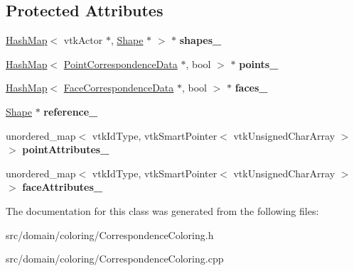 \subsection*{Protected Attributes}
\begin{DoxyCompactItemize}
\item 
\hypertarget{class_correspondence_coloring_a279562196a4636d10f1d54319eb96129}{}\hyperlink{class_hash_map}{Hash\+Map}$<$ vtk\+Actor $\ast$, \hyperlink{class_shape}{Shape} $\ast$ $>$ $\ast$ {\bfseries shapes\+\_\+}\label{class_correspondence_coloring_a279562196a4636d10f1d54319eb96129}

\item 
\hypertarget{class_correspondence_coloring_a925be65ac98dabc0959085f7972c79f1}{}\hyperlink{class_hash_map}{Hash\+Map}$<$ \hyperlink{class_point_correspondence_data}{Point\+Correspondence\+Data} $\ast$, bool $>$ $\ast$ {\bfseries points\+\_\+}\label{class_correspondence_coloring_a925be65ac98dabc0959085f7972c79f1}

\item 
\hypertarget{class_correspondence_coloring_a61ef00707cd1882293d58cfb750ab2f2}{}\hyperlink{class_hash_map}{Hash\+Map}$<$ \hyperlink{class_face_correspondence_data}{Face\+Correspondence\+Data} $\ast$, bool $>$ $\ast$ {\bfseries faces\+\_\+}\label{class_correspondence_coloring_a61ef00707cd1882293d58cfb750ab2f2}

\item 
\hypertarget{class_correspondence_coloring_a30cb4c9172b8edf1a0597fed5e0270a0}{}\hyperlink{class_shape}{Shape} $\ast$ {\bfseries reference\+\_\+}\label{class_correspondence_coloring_a30cb4c9172b8edf1a0597fed5e0270a0}

\item 
\hypertarget{class_correspondence_coloring_ab9fddd8872a1af4208c4622691e5dbaf}{}unordered\+\_\+map$<$ vtk\+Id\+Type, vtk\+Smart\+Pointer$<$ vtk\+Unsigned\+Char\+Array $>$ $>$ {\bfseries point\+Attributes\+\_\+}\label{class_correspondence_coloring_ab9fddd8872a1af4208c4622691e5dbaf}

\item 
\hypertarget{class_correspondence_coloring_a964a931d8747f1c8c85e28c0f0ff8e48}{}unordered\+\_\+map$<$ vtk\+Id\+Type, vtk\+Smart\+Pointer$<$ vtk\+Unsigned\+Char\+Array $>$ $>$ {\bfseries face\+Attributes\+\_\+}\label{class_correspondence_coloring_a964a931d8747f1c8c85e28c0f0ff8e48}

\end{DoxyCompactItemize}


The documentation for this class was generated from the following files\+:\begin{DoxyCompactItemize}
\item 
src/domain/coloring/Correspondence\+Coloring.\+h\item 
src/domain/coloring/Correspondence\+Coloring.\+cpp\end{DoxyCompactItemize}
